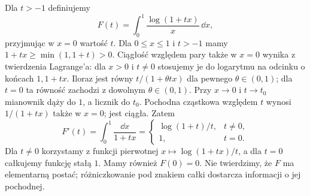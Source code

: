 \begin{przyklad}
\label{ma1:ex:parameter-log}
Dla $t>-1$ definiujemy
\[
 F(t)=\int_0^1\frac{\log(1+tx)}{x}\,\dd x,
\]
przyjmując w $x=0$ wartość $t$. Dla $0\le x\le1$ i $t>-1$ mamy $1+tx\ge\min(1,1+t)>0$. Ciągłość względem pary także w $x=0$ wynika z twierdzenia Lagrange'a: dla $x>0$ i $t\ne0$ stosujemy je do logarytmu na odcinku o końcach $1,1+tx$. Iloraz jest równy $t/(1+\theta tx)$ dla pewnego $\theta\in(0,1)$; dla $t=0$ ta równość zachodzi z dowolnym $\theta\in(0,1)$. Przy $x\to0$ i $t\to t_0$ mianownik dąży do $1$, a licznik do $t_0$. Pochodna cząstkowa względem $t$ wynosi $1/(1+tx)$ także w $x=0$; jest ciągła. Zatem
\[
 F'(t)=\int_0^1\frac{\dd x}{1+tx}
 =\begin{cases}\log(1+t)/t,&t\ne0,\\1,&t=0.\end{cases}
\]
Dla $t\ne0$ korzystamy z funkcji pierwotnej $x\mapsto\log(1+tx)/t$, a dla $t=0$ całkujemy funkcję stałą $1$. Mamy również $F(0)=0$. Nie twierdzimy, że $F$ ma elementarną postać; różniczkowanie pod znakiem całki dostarcza informacji o jej pochodnej.
\end{przyklad}

